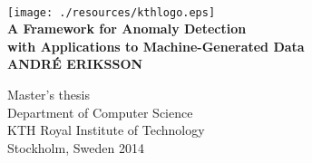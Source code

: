 \begin{titlepage}
\begin{center}

\quad\\[1.4cm]
\texttt{[image: ./resources/kthlogo.eps]}~\\[2.5cm]

{\LARGE \bfseries A Framework for Anomaly Detection \\ with Applications to Machine-Generated Data}\\[3.0cm]

{\large \bfseries ANDRÉ ERIKSSON}\\[1.8cm]

\vfill

{Master's thesis\\Department of Computer Science\\ KTH Royal Institute of Technology\\ Stockholm, Sweden 2014}

\end{center}
\end{titlepage}
